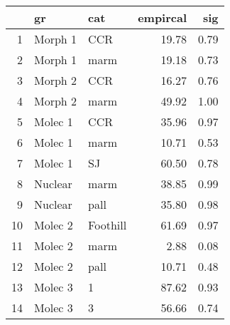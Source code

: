\begin{table}[ht]
\centering
\begin{tabular}{rllrr}
  \hline
 & gr & cat & empircal & sig \\ 
  \hline
1 & Morph 1 & CCR & 19.78 & 0.79 \\ 
  2 & Morph 1 & marm & 19.18 & 0.73 \\ 
  3 & Morph 2 & CCR & 16.27 & 0.76 \\ 
  4 & Morph 2 & marm & 49.92 & 1.00 \\ 
  5 & Molec 1 & CCR & 35.96 & 0.97 \\ 
  6 & Molec 1 & marm & 10.71 & 0.53 \\ 
  7 & Molec 1 & SJ & 60.50 & 0.78 \\ 
  8 & Nuclear & marm & 38.85 & 0.99 \\ 
  9 & Nuclear & pall & 35.80 & 0.98 \\ 
  10 & Molec 2 & Foothill & 61.69 & 0.97 \\ 
  11 & Molec 2 & marm & 2.88 & 0.08 \\ 
  12 & Molec 2 & pall & 10.71 & 0.48 \\ 
  13 & Molec 3 & 1 & 87.62 & 0.93 \\ 
  14 & Molec 3 & 3 & 56.66 & 0.74 \\ 
   \hline
\end{tabular}
\label{rfmiss}
\end{table}
